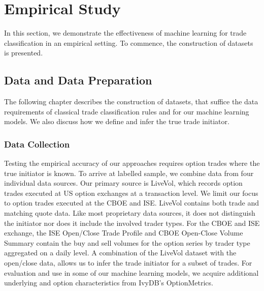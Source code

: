 \newpage
{}
\section{Empirical Study}\label{sec:empirical-study}

In this section, we demonstrate the effectiveness of machine learning for trade classification in an empirical setting. To commence, the construction of datasets is presented.

\subsection{Data and Data Preparation}\label{sec:data-and-data-preparation}

The following chapter describes the construction of datasets, that suffice the data requirements of classical trade classification rules and for our machine learning models. We also discuss how we define and infer the true trade initiator.

\subsubsection{Data Collection}\label{sec:data-collection}


Testing the empirical accuracy of our approaches requires option trades where the true initiator is known. To arrive at labelled sample, we combine data from four individual data sources. Our primary source is LiveVol, which records option trades executed at US option exchanges at a transaction level. We limit our focus to option trades executed at the \gls{CBOE} and \gls{ISE}. LiveVol contains both trade and matching quote data. Like most proprietary data sources, it does not distinguish the initiator nor does it include the involved trader types. For the \gls{CBOE} and \gls{ISE} exchange, the \gls{ISE} Open/Close Trade Profile and \gls{CBOE} Open-Close Volume Summary contain the buy and sell volumes for the option series by trader type aggregated on a daily level. A combination of the LiveVol dataset with the open/close data, allows us to infer the trade initiator for a subset of trades. For evaluation and use in some of our machine learning models, we acquire additional underlying and option characteristics from IvyDB's OptionMetrics.


